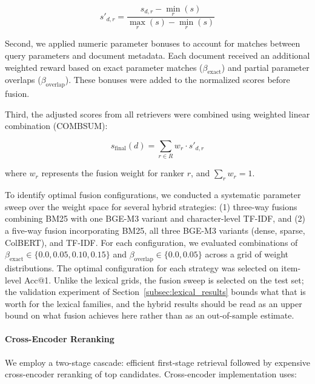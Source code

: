 \documentclass[preprint,12pt]{elsarticle}
\begin{document}
\begin{equation}
s'_{d,r} = \frac{s_{d,r} - \min_r(s)}{\max_r(s) - \min_r(s)}
\end{equation}

Second, we applied numeric parameter bonuses to account for matches between query parameters and document metadata. Each document received an additional weighted reward based on exact parameter matches ($\beta_{\text{exact}}$) and partial parameter overlaps ($\beta_{\text{overlap}}$). These bonuses were added to the normalized scores before fusion.

Third, the adjusted scores from all retrievers were combined using weighted linear combination (COMBSUM):

\begin{equation}
s_{\text{final}}(d) = \sum_{r \in R} w_r \cdot s'_{d,r}
\end{equation}

where $w_r$ represents the fusion weight for ranker $r$, and $\sum_{r} w_r = 1$.

To identify optimal fusion configurations, we conducted a systematic parameter sweep over the weight space for several hybrid strategies: (1) three-way fusions combining BM25 with one BGE-M3 variant and character-level TF-IDF, and (2) a five-way fusion incorporating BM25, all three BGE-M3 variants (dense, sparse, ColBERT), and TF-IDF. For each configuration, we evaluated combinations of $\beta_{\text{exact}} \in \{0.0, 0.05, 0.10, 0.15\}$ and $\beta_{\text{overlap}} \in \{0.0, 0.05\}$ across a grid of weight distributions. The optimal configuration for each strategy was selected on item-level Acc@1. Unlike the lexical grids, the fusion sweep is selected on the test set; the validation experiment of Section~\ref{subsec:lexical_results} bounds what that is worth for the lexical families, and the hybrid results should be read as an upper bound on what fusion achieves here rather than as an out-of-sample estimate.

\paragraph{Cross-Encoder Reranking}
We employ a two-stage cascade: efficient first-stage retrieval followed by expensive cross-encoder reranking of top candidates. Cross-encoder implementation uses:
\end{document}
